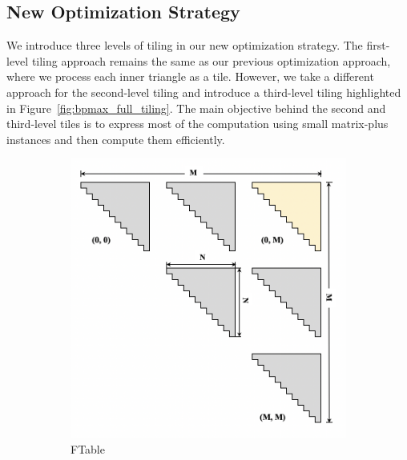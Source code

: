 \subsection{New Optimization Strategy}
We introduce three levels of tiling in our new optimization strategy. The first-level tiling approach remains the same as our previous optimization approach, where we process each inner triangle as a tile. However, we take a different approach for the second-level tiling and introduce a third-level tiling highlighted in Figure~\ref{fig:bpmax_full_tiling}. The main objective behind the second and third-level tiles is to express most of the computation using small matrix-plus instances and then compute them efficiently.

\begin{figure}[htbp]
\centering
    \begin{subfigure}[htbp]{0.22\linewidth}
    \centering
    \includegraphics[scale=0.29, trim=2 2 2 2,clip]{content/figures/tile_0.png}
    \caption{FTable}
    \label{fig:tile_1}
    \end{subfigure}
    \begin{subfigure}[htbp]{0.22\linewidth}
    \centering

\end{subfigure}
\end{figure}
